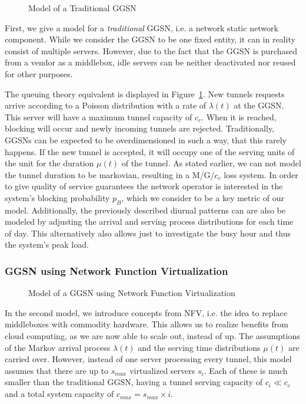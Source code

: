 \begin{figure}[htbp]
  \centering
  \resizebox{0.6\textwidth}{!}{}
  \caption{Model of a Traditional GGSN}
  \label{fig:model_traditional_ggsn}
\end{figure}

First, we give a model for a \emph{traditional} \gls{GGSN}, i.e. a network static network component.
While we consider the \gls{GGSN} to be one fixed entity, it can in reality consist of multiple servers. However, due to the fact that the \gls{GGSN} is purchased from a vendor as a middlebox, idle servers can be neither deactivated nor reused for other purposes.

The queuing theory equivalent is displayed in Figure~\ref{fig:model_traditional_ggsn}. New tunnels requests arrive according to a Poisson distribution with a rate of $\lambda(t)$ at the GGSN. This server will have a maximum tunnel capacity of $c_c$. When it is reached, blocking will occur and newly incoming tunnels are rejected. Traditionally, \glspl{GGSN} can be expected to be overdimensioned in such a way, that this rarely happens. If the new tunnel is accepted, it will occupy one of the serving units of the unit for the duration $\mu(t)$ of the tunnel. As stated earlier, we can not model the tunnel duration to be markovian, resulting in a  M/G/$c_c$ loss system. In order to give quality of service guarantees the network operator is interested in the system's blocking probability $p_B$, which we consider to be a key metric of our model. Additionally, the previously described diurnal patterns can are also be modeled by adjusting the arrival and serving process distributions for each time of day. This alternatively also allows just to investigate the busy hour and thus the system's peak load.


\subsubsection{GGSN using Network Function Virtualization}
\label{c4:sec:virtual_ggsn}

\begin{figure}[htbp]
  \centering
  
  \caption{Model of a GGSN using Network Function Virtualization}
  \label{c4:fig:model_nfv_ggsn}
\end{figure}

In the second model, we introduce concepts from \gls{NFV}, i.e. the idea to replace middleboxes with commodity hardware. This allows us to realize benefits from cloud computing, as we are now able to scale out, instead of up. The assumptions of the Markov arrival process $\lambda(t)$ and the serving time distributions $\mu(t)$ are carried over. However, instead of one server processing every tunnel, this model assumes that there are up to $s_{max}$ virtualized servers $s_i$. Each of these is much smaller than the traditional GGSN, having a tunnel serving capacity of $c_i \ll c_c$ and a total system capacity of $c_{max} = s_{max} \times i$.

